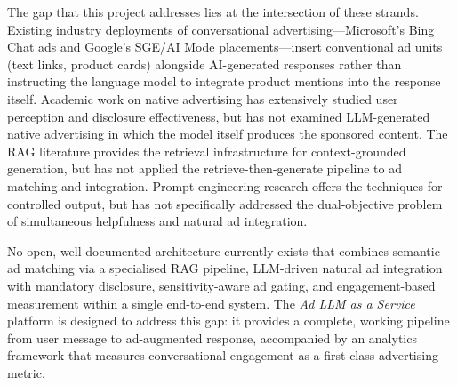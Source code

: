 The gap that this project addresses lies at the intersection of these
strands. Existing industry deployments of conversational
advertising---Microsoft's Bing Chat ads and Google's SGE/AI Mode
placements---insert conventional ad units (text links, product cards)
alongside AI-generated responses rather than instructing the language
model to integrate product mentions into the response itself.
Academic work on native advertising has extensively studied user
perception and disclosure effectiveness, but has not examined
LLM-generated native advertising in which the model itself produces
the sponsored content. The RAG literature provides the retrieval
infrastructure for context-grounded generation, but has not applied
the retrieve-then-generate pipeline to ad matching and integration.
Prompt engineering research offers the techniques for controlled
output, but has not specifically addressed the dual-objective problem
of simultaneous helpfulness and natural ad integration.

No open, well-documented architecture currently exists that combines
semantic ad matching via a specialised RAG pipeline, LLM-driven
natural ad integration with mandatory disclosure, sensitivity-aware ad
gating, and engagement-based measurement within a single end-to-end
system. The \textit{Ad LLM as a Service} platform is designed to
address this gap: it provides a complete, working pipeline from user
message to ad-augmented response, accompanied by an analytics
framework that measures conversational engagement as a first-class
advertising metric.
